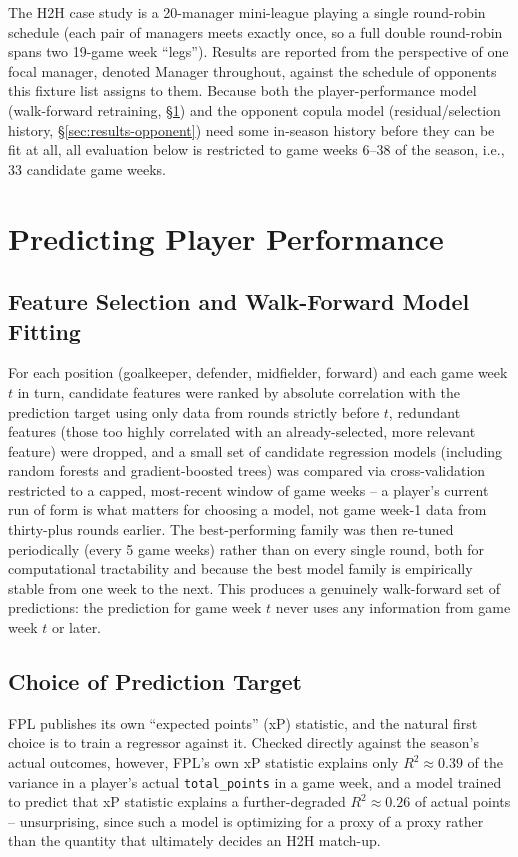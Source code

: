			The H2H case study is a 20-manager mini-league playing a single round-robin schedule (each pair of managers meets exactly once, so a full double round-robin spans two 19-game week ``legs''). Results are reported from the perspective of one focal manager, denoted Manager throughout, against the schedule of opponents this fixture list assigns to them. Because both the player-performance model (walk-forward retraining, \S\ref{sec:results-predictor}) and the opponent copula model (residual/selection history, \S\ref{sec:results-opponent}) need some in-season history before they can be fit at all, all evaluation below is restricted to game weeks 6--38 of the season, i.e., 33 candidate game weeks.

		\section{Predicting Player Performance} \label{sec:results-predictor}
			\subsection{Feature Selection and Walk-Forward Model Fitting}
				For each position (goalkeeper, defender, midfielder, forward) and each game week $t$ in turn, candidate features were ranked by absolute correlation with the prediction target using only data from rounds strictly before $t$, redundant features (those too highly correlated with an already-selected, more relevant feature) were dropped, and a small set of candidate regression models (including random forests and gradient-boosted trees) was compared via cross-validation restricted to a capped, most-recent window of game weeks -- a player's current run of form is what matters for choosing a model, not game week-1 data from thirty-plus rounds earlier. The best-performing family was then re-tuned periodically (every 5 game weeks) rather than on every single round, both for computational tractability and because the best model family is empirically stable from one week to the next. This produces a genuinely walk-forward set of predictions: the prediction for game week $t$ never uses any information from game week $t$ or later.

			\subsection{Choice of Prediction Target}
				FPL publishes its own ``expected points'' (xP) statistic, and the natural first choice is to train a regressor against it. Checked directly against the season's actual outcomes, however, FPL's own xP statistic explains only $R^2 \approx 0.39$ of the variance in a player's actual \texttt{total\_points} in a game week, and a model trained to predict that xP statistic explains a further-degraded $R^2 \approx 0.26$ of actual points -- unsurprising, since such a model is optimizing for a proxy of a proxy rather than the quantity that ultimately decides an H2H match-up.

